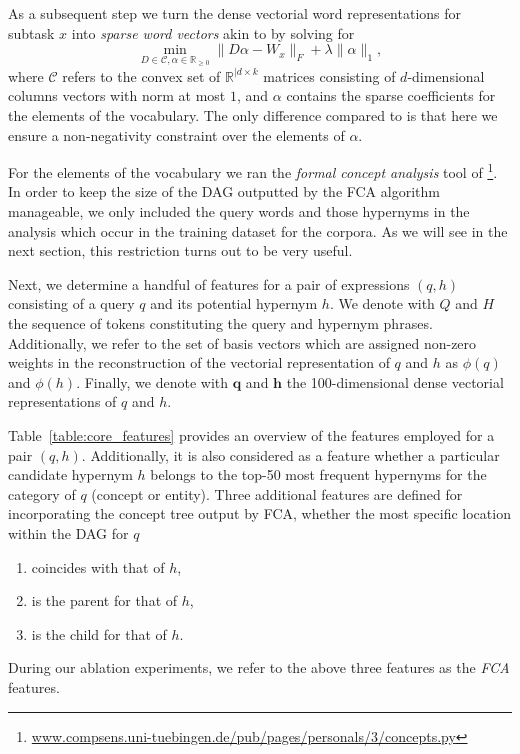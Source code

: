 \documentclass[11pt,a4paper]{article}
\begin{document}
As a subsequent step we turn the dense vectorial word representations for subtask $x$ into
\emph{sparse word vectors} akin to \citet{Berend:2017} by solving for
\begin{equation}
\min\limits_{D \in \mathcal{C}, \alpha \in \mathbb{R}_{\geq0}} \lVert D\alpha - W_{x} \rVert_F + \lambda \lVert \alpha \rVert_1,
\label{nonneg_SPAMS_objective}
\end{equation}
where $\mathcal{C}$ refers to the convex set of $\mathbb{R}^{\lvert d \times k}$ matrices consisting of $d$-dimensional columns vectors
with norm at most $1$, and $\alpha$ contains the sparse coefficients for the elements of the vocabulary. The only difference
compared to \citet{Berend:2017} is that here we ensure a non-negativity
constraint over the elements of $\alpha$.

For the elements of the vocabulary we ran the \emph{formal concept analysis} tool of
\citet{Endres:2010}\footnote{\url{www.compsens.uni-tuebingen.de/pub/pages/personals/3/concepts.py}}. In order to keep the size of the DAG outputted by the FCA algorithm manageable, we only included the query words and those hypernyms in the analysis which occur in the training dataset for the corpora.
As we will see in the next section, this restriction turns out to be very useful.

Next, we determine a handful of features for a pair of expressions $(q, h)$
consisting of a query $q$ and its potential hypernym $h$. We denote with $Q$
and $H$ the sequence of tokens constituting the query and hypernym phrases.
Additionally, we refer to the set of basis vectors which are assigned non-zero weights in the reconstruction of the vectorial representation of $q$ and $h$ as $\phi(q)$ and $\phi(h)$. Finally, we denote with $\mathbf{q}$ and $\mathbf{h}$ the 100-dimensional dense vectorial representations of $q$ and $h$.

Table~\ref{table:core_features} provides an overview of the features employed
for a pair $(q, h)$. Additionally, it is also considered as a feature whether a
particular candidate hypernym $h$ belongs to the top-50 most frequent hypernyms
for the category of $q$ (concept or entity).
Three additional features are defined for incorporating the concept tree output
by FCA, whether the most specific location within the DAG for $q$
\begin{enumerate}
	\item coincides with that of $h$,
	\item is the parent for that of $h$,
	\item is the child for that of $h$.
\end{enumerate}
During our ablation experiments, we refer to the above three features as the \emph{FCA} features.
\end{document}
